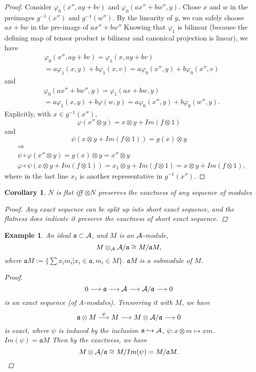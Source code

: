 \documentclass[11pt]{article}
\newtheorem{cor}[thm]{Corollary}
\newtheorem{ex}[thm]{Example}
\newcommand{\sca}{{\mathfrak a}}
\newcommand{\cala}{{\cal A}}
\newcommand{\Lrta}{\Longrightarrow}
\newcommand{\lrta}{\longrightarrow}
\newcommand{\inj}{\hookrightarrow}
\begin{document}
\begin{proof}
Consider  $\varphi_0(x'',ay+bv)$ and $\varphi_0(ax''+bw'',y)$. Chose $x$ and $w$ in the preimages $g^{-1}(x'')$ and $g^{-1}(w'')$. By the linearity of $g$, we can safely choose $ax+bw$ in the pre-image of $ax''+bw''$
Knowing that $\varphi_1$ is bilinear (because the defining map of tensor product is bilinear and canonical projection is linear), we have
$$
\begin{aligned}
&\varphi_0(x'',ay+bv)=\varphi_1(x,ay+bv)\\
&=a\varphi_1(x,y)+b\varphi_1(x,v)=a\varphi_0(x'',y)+b\varphi_0(x'',v)
\end{aligned}
$$
and
$$
\begin{aligned}
&\varphi_0(ax''+bw'',y)=\varphi_1(ax+bw,y)\\
&=a\varphi_1(x,y)+b\varphi(w,y)=a\varphi_0(x'',y)+b\varphi_0(w'',y).
\end{aligned}
$$ 
Explicitly, with $x\in g^{-1}(x'')$, 
$$
\varphi(x''\otimes y)=x\otimes y+Im(f\otimes 1)
$$
and
$$
\psi(x\otimes y+Im(f\otimes 1))=g(x)\otimes y
$$
$$
\begin{aligned}
&\Lrta\\
&\psi\circ\varphi(x''\otimes y)=g(x)\otimes y=x''\otimes y\\
&\varphi\circ \psi(x\otimes y+Im(f\otimes 1))=x_1\otimes y+Im(f\otimes 1)=x\otimes y+Im(f\otimes 1),
\end{aligned}
$$
where in the last line $x_1$ is another representative in $g^{-1}(x'')$.
\end{proof}

\begin{cor}
$N$ is flat iff $\otimes N$ preserves the exactness of any sequence of modules
\begin{proof}
Any exact sequence can be split up into short exact sequence, and the flatness does indicate it preserve  the exactness of short exact sequence.
\end{proof}
\end{cor}

\begin{ex}\label{ex:iso_quotient_module}
An ideal
$\sca\subset \cala$, and $M$ is an $\cala$-module,
$$
M\otimes_\cala \cala/\sca\cong M/\sca M,
$$
where $\sca M:=\{\sum x_i m_i|x_i\in \sca, m_i\in M\}$. $\sca M$ is a submodule of $M$.
\begin{proof}
$$
0\lrta \sca\lrta \cala\lrta \cala/\sca\lrta 0 
$$
is an exact sequence (of \cala-modules). Tensorring it with $M$, we have
$$
\sca\otimes M\overset{\psi}{\lrta }M\lrta M\otimes \cala/\sca\lrta 0
$$
is exact, where $\psi $ is induced by the inclusion $\sca\inj\cala$, $\psi:x\otimes m\mapsto xm$. $Im(\psi)=\sca M$
Then by the exactness, we have
$$
M\otimes \cala/\sca\cong M/Im(\psi)=M/\sca M.
$$
\end{proof}
\end{ex}
\end{document}
